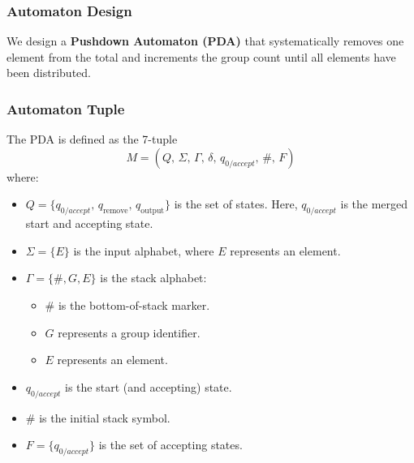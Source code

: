 \documentclass[11pt]{article}
\begin{document}
\subsubsection*{Automaton Design}
We design a \textbf{Pushdown Automaton (PDA)} that systematically removes one element from the total and increments the group count until all elements have been distributed.

\subsubsection*{Automaton Tuple}
The PDA is defined as the 7-tuple
\[
M = (Q,\, \Sigma,\, \Gamma,\, \delta,\, q_{0/accept},\, \#,\, F)
\]
where:
\begin{itemize}
    \item \(Q = \{q_{0/accept},\, q_{\text{remove}},\, q_{\text{output}}\}\) is the set of states. Here, \(q_{0/accept}\) is the merged start and accepting state.
    \item \(\Sigma = \{E\}\) is the input alphabet, where \(E\) represents an element.
    \item \(\Gamma = \{\#, G, E\}\) is the stack alphabet:
    \begin{itemize}
        \item \(\#\) is the bottom-of-stack marker.
        \item \(G\) represents a group identifier.
        \item \(E\) represents an element.
    \end{itemize}
    \item \(q_{0/accept}\) is the start (and accepting) state.
    \item \(\#\) is the initial stack symbol.
    \item \(F = \{q_{0/accept}\}\) is the set of accepting states.
\end{itemize}
\end{document}
